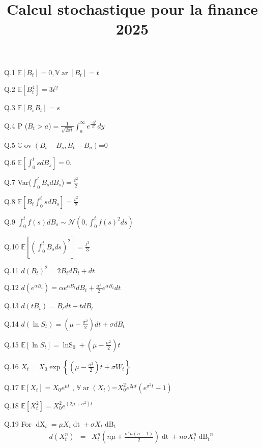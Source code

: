 \documentclass{article}
\newcommand{\tmop}[1]{\ensuremath{\operatorname{#1}}}
\begin{document}
\title{Calcul stochastique pour la finance 2025}

\maketitle

Q.1 $\mathbb{E} [B_t] = 0, \mathbb{V} \tmop{ar} [B_t] = t$

Q.2 $\mathbb{E} [B_t^4] = 3 t^2$

Q.3 $\mathbb{E} [B_s  B_t] = s$

Q.4  P ($B_t > a$)$= \frac{1}{\sqrt{2 \pi t }} \int_a^{\infty} e^{\frac{-
y^2}{2 t}} d y$

Q.5 $\mathbb{C} \tmop{ov} (B_t - B_s, B_t - B_u)$=0

Q.6 $\mathbb{E} \left[ \int_{0 }^t s d B_s \right] = 0.$

Q.7  Var($\int_{0 }^t B_s d B_s$)$= \frac{ t^2}{2}$

Q.8 $\mathbb{E} \left[ B_t \int_{0 }^t s d B_s \right] = \frac{ t^2}{2}$

Q.9 $\int_0^t f (s) d B_s \sim \mathcal{N} \left( 0, \int_0^t f (s)^2 d s
\right)$

Q.10 $\mathbb{E} \left[ \left( \int_0^t B_s d s \right)^2 \right] = \frac{
t^3}{3}$

Q.11 $d (B_t)^2 = 2 B_t d B_t + d t$

Q.12 $d (e^{\alpha B_t})  = \alpha e^{\alpha B_t} d B_t + \frac{\alpha^2}{2}
e^{\alpha B_t} d t$

Q.13 $d (t B_t)  = B_t d t + t d B_t$

Q.14 $d (\ln S_t)  = \left( \mu - \frac{\sigma^2}{2} \right) d t + \sigma d
B_t $

Q.15 $\mathbb{E} [\ln S_t] = \tmop{lnS}_0 + \left( \mu - \frac{\sigma^2}{2}
\right) t$

Q.16 $X_t = X_0 \exp \left\{ \left( \mu - \frac{\sigma^2}{2} \right) t +
\sigma W_t \right\}$

Q.17 $\mathbb{E} [X_t] = X_0 e^{\mu t}$ , $\mathbb{V} \tmop{ar} (X_t)$=$X_0^2
e^{2 \mu t} (e^{\sigma^2 t} - 1)$

Q.18 $\mathbb{E} [X_t^2] = X_{0 }^2 e^{(2 \mu + \sigma^2) t}$

Q.19 For $\tmop{dX}_t = \mu X_t \tmop{dt} + \sigma X_t \tmop{dB}_t$
\begin{eqnarray*}
  d (X_t^n) & = & X_t^n \left( n \mu  + \frac{\sigma^2 n (n - 1)}{2} \right)  
  \tmop{dt} + n \sigma X_t^n {\tmop{dB}_t} ^n
\end{eqnarray*}
\end{document}
